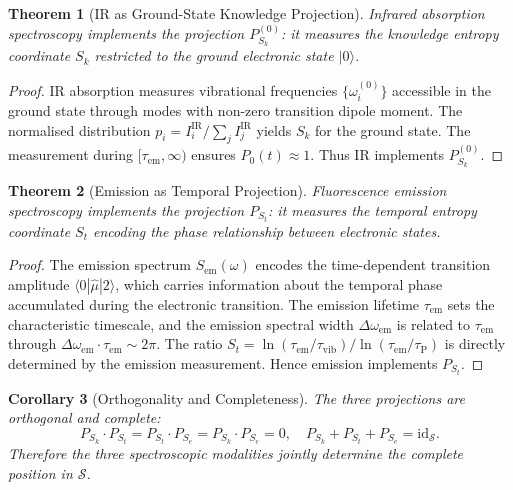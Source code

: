 \documentclass[11pt,twocolumn,a4paper]{article}
\newtheorem{theorem}{Theorem}[section]
\newtheorem{corollary}[theorem]{Corollary}
\theoremstyle{definition}
\theoremstyle{remark}
\newcommand{\Sk}{S_k}
\newcommand{\St}{S_t}
\newcommand{\Se}{S_e}
\newcommand{\Sspace}{\mathcal{S}}
\begin{document}
\begin{theorem}[IR as Ground-State Knowledge Projection]
\label{thm:ir_proj}
Infrared absorption spectroscopy implements the projection $P_{\Sk}^{(0)}$: it measures the knowledge entropy coordinate $\Sk$ restricted to the ground electronic state $|0\rangle$.
\end{theorem}

\begin{proof}
IR absorption measures vibrational frequencies $\{\omega_i^{(0)}\}$ accessible in the ground state through modes with non-zero transition dipole moment. The normalised distribution $p_i = I_i^{\mathrm{IR}} / \sum_j I_j^{\mathrm{IR}}$ yields $\Sk$ for the ground state. The measurement during $[\tau_{\mathrm{em}}, \infty)$ ensures $P_0(t) \approx 1$. Thus IR implements $P_{\Sk}^{(0)}$.
\end{proof}

\begin{theorem}[Emission as Temporal Projection]
\label{thm:emission_proj}
Fluorescence emission spectroscopy implements the projection $P_{\St}$: it measures the temporal entropy coordinate $\St$ encoding the phase relationship between electronic states.
\end{theorem}

\begin{proof}
The emission spectrum $S_{\mathrm{em}}(\omega)$ encodes the time-dependent transition amplitude $\langle 0 | \hat{\mu} | 2 \rangle$, which carries information about the temporal phase accumulated during the electronic transition. The emission lifetime $\tau_{\mathrm{em}}$ sets the characteristic timescale, and the emission spectral width $\Delta\omega_{\mathrm{em}}$ is related to $\tau_{\mathrm{em}}$ through $\Delta\omega_{\mathrm{em}} \cdot \tau_{\mathrm{em}} \sim 2\pi$. The ratio $\St = \ln(\tau_{\mathrm{em}}/\tau_{\mathrm{vib}}) / \ln(\tau_{\mathrm{em}}/\tau_{\mathrm{P}})$ is directly determined by the emission measurement. Hence emission implements $P_{\St}$.
\end{proof}

\begin{corollary}[Orthogonality and Completeness]
\label{cor:complete}
The three projections are orthogonal and complete:
\begin{equation}
P_{\Sk} \cdot P_{\St} = P_{\St} \cdot P_{\Se} = P_{\Sk} \cdot P_{\Se} = 0, \quad P_{\Sk} + P_{\St} + P_{\Se} = \mathrm{id}_{\Sspace}.
\end{equation}
Therefore the three spectroscopic modalities jointly determine the complete position in $\Sspace$.
\end{corollary}
\end{document}
